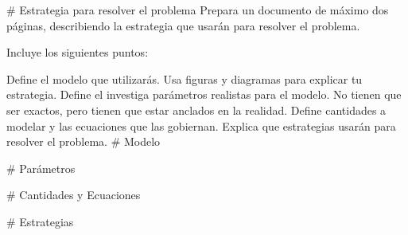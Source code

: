 # Estrategia para resolver el problema
Prepara un documento de máximo dos páginas, describiendo la estrategia que usarán para resolver el problema.

Incluye los siguientes puntos:

Define el modelo que utilizarás. Usa figuras y diagramas para explicar tu estrategia.
Define el investiga parámetros realistas para el modelo. No tienen que ser exactos, pero tienen que estar anclados en la realidad.
Define cantidades a modelar y las ecuaciones que las gobiernan.
Explica que estrategias usarán para resolver el problema.
# Modelo 

# Parámetros

# Cantidades y Ecuaciones

# Estrategias